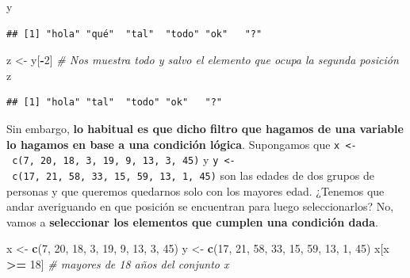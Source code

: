 \documentclass[11pt,]{book}
\newenvironment{Shaded}{\begin{snugshade}}{\end{snugshade}}
\newcommand{\CommentTok}[1]{\textcolor[rgb]{0.37,0.37,0.37}{\textit{#1}}}
\newcommand{\DecValTok}[1]{\textcolor[rgb]{0.06,0.06,0.06}{#1}}
\newcommand{\KeywordTok}[1]{\textcolor[rgb]{0.27,0.27,0.27}{\textbf{#1}}}
\newcommand{\NormalTok}[1]{#1}
\newcommand{\OperatorTok}[1]{\textcolor[rgb]{0.43,0.43,0.43}{\textbf{#1}}}
\newcommand{\StringTok}[1]{\textcolor[rgb]{0.5,0.5,0.5}{#1}}
\begin{document}
\begin{Shaded}
\begin{Highlighting}[]
\NormalTok{y}
\end{Highlighting}
\end{Shaded}

\begin{verbatim}
## [1] "hola" "qué"  "tal"  "todo" "ok"   "?"
\end{verbatim}

\begin{Shaded}
\begin{Highlighting}[]
\NormalTok{z <-}\StringTok{ }\NormalTok{y[}\OperatorTok{-}\DecValTok{2}\NormalTok{] }\CommentTok{# Nos muestra todo y salvo el elemento que ocupa la segunda posición}
\NormalTok{z}
\end{Highlighting}
\end{Shaded}

\begin{verbatim}
## [1] "hola" "tal"  "todo" "ok"   "?"
\end{verbatim}

Sin embargo, \textbf{lo habitual es que dicho filtro que hagamos de una variable lo hagamos en base a una condición lógica}. Supongamos que \texttt{x\ \textless{}-\ c(7,\ 20,\ 18,\ 3,\ 19,\ 9,\ 13,\ 3,\ 45)} y \texttt{y\ \textless{}-\ c(17,\ 21,\ 58,\ 33,\ 15,\ 59,\ 13,\ 1,\ 45)} son las edades de dos grupos de personas y que queremos quedarnos solo con los mayores edad. ¿Tenemos que andar averiguando en que posición se encuentran para luego seleccionarlos? No, vamos a \textbf{seleccionar los elementos que cumplen una condición dada}.

\begin{Shaded}
\begin{Highlighting}[]
\NormalTok{x <-}\StringTok{ }\KeywordTok{c}\NormalTok{(}\DecValTok{7}\NormalTok{, }\DecValTok{20}\NormalTok{, }\DecValTok{18}\NormalTok{, }\DecValTok{3}\NormalTok{, }\DecValTok{19}\NormalTok{, }\DecValTok{9}\NormalTok{, }\DecValTok{13}\NormalTok{, }\DecValTok{3}\NormalTok{, }\DecValTok{45}\NormalTok{)}
\NormalTok{y <-}\StringTok{ }\KeywordTok{c}\NormalTok{(}\DecValTok{17}\NormalTok{, }\DecValTok{21}\NormalTok{, }\DecValTok{58}\NormalTok{, }\DecValTok{33}\NormalTok{, }\DecValTok{15}\NormalTok{, }\DecValTok{59}\NormalTok{, }\DecValTok{13}\NormalTok{, }\DecValTok{1}\NormalTok{, }\DecValTok{45}\NormalTok{)}
\NormalTok{x[x }\OperatorTok{>=}\StringTok{ }\DecValTok{18}\NormalTok{] }\CommentTok{# mayores de 18 años del conjunto x}
\end{Highlighting}
\end{Shaded}
\end{document}
